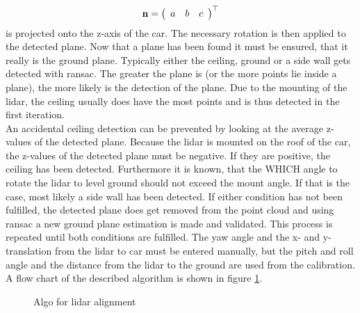 \begin{equation}
    \vb{n} = \left(\begin{array}{lll} a & b & c \end{array}\right)^{\top}
\end{equation}
is projected onto the z-axis of the car.
The necessary rotation is then applied to the detected plane.
Now that a plane has been found it must be ensured, that it really is the ground plane.
Typically either the ceiling, ground or a side wall gets detected with \gls{ransac}.
The greater the plane is (or the more points lie inside a plane), the more likely is the detection of the plane.
Due to the mounting of the lidar, the ceiling usually does have the most points and is thus detected in the first iteration.\\
An accidental ceiling detection can be prevented by looking at the average z-values of the detected plane.
Because the lidar is mounted on the roof of the car, the z-values of the detected plane must be negative.
If they are positive, the ceiling has been detected.
Furthermore it is known, that the WHICH angle to rotate the lidar to level ground should not exceed the mount angle.
If that is the case, most likely a side wall has been detected.
If either condition has not been fulfilled, the detected plane does get removed from the point cloud and using \gls{ransac} a new ground plane estimation is made and validated.
This process is repeated until both conditions are fulfilled.
The yaw angle and the x- and y-translation from the \gls{lidar} to car
must be entered manually, but the pitch and roll angle and the distance from the \gls{lidar} to the ground are used from the calibration.
A flow chart of the described algorithm is shown in figure \ref{fig:flowchart_lidar_calibration}.

\begin{figure}[htb]
    \centering
    
    \caption{Algo for \acrshort{lidar} alignment}
    \label{fig:flowchart_lidar_calibration}
\end{figure}

